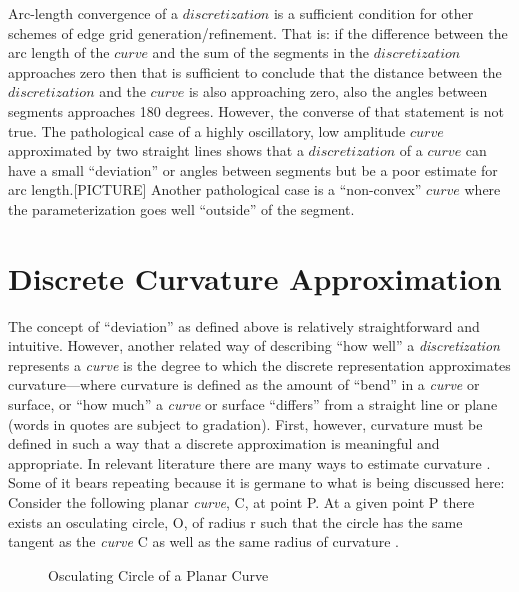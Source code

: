 \documentclass[preprint,12pt]{elsarticle}
\begin{document}
Arc-length convergence of a $discretization$ is a sufficient condition for other schemes of edge grid generation/refinement.  That is: if the difference between the arc length of the $curve$ and the sum of the segments in the $discretization$ approaches zero then that is sufficient to conclude that the distance between the $discretization$ and the $curve$ is also approaching zero, also the angles between segments approaches 180 degrees.  However, the converse of that statement is not true.  The pathological case of a highly oscillatory, low amplitude $curve$ approximated by two straight lines shows that a $discretization$ of a $curve$ can have a small ``deviation'' or angles between segments but be a poor estimate for arc length.[PICTURE]  Another pathological case is a ``non-convex'' $curve$ where the parameterization goes well ``outside'' of the segment.

\section{Discrete Curvature Approximation}
The concept of ``deviation'' as defined above is relatively straightforward and intuitive. However, another related way of describing ``how well'' a \textit{discretization} represents a \textit{curve} is the degree to which the discrete representation approximates curvature—where curvature is defined as the amount of ``bend'' in a \textit{curve} or surface, or ``how much'' a \textit{curve} or surface ``differs'' from a straight line or plane (words in quotes are subject to gradation). First, however, curvature must be defined in such a way that a discrete approximation is meaningful and appropriate. In relevant literature there are many ways to estimate curvature \cite{hermann07}. Some of it bears repeating because it is germane to what is being discussed here: Consider the following planar \textit{curve}, C, at point P. At a given point P there exists an osculating circle, O, of radius r such that the circle has the same tangent as the \textit{curve} C as well as the same radius of curvature \cite{gray97}. \\

\begin{figure}[h!]
  \caption{\label{OsculatingCircle} Osculating Circle of a Planar Curve}
\end{figure}
\end{document}
